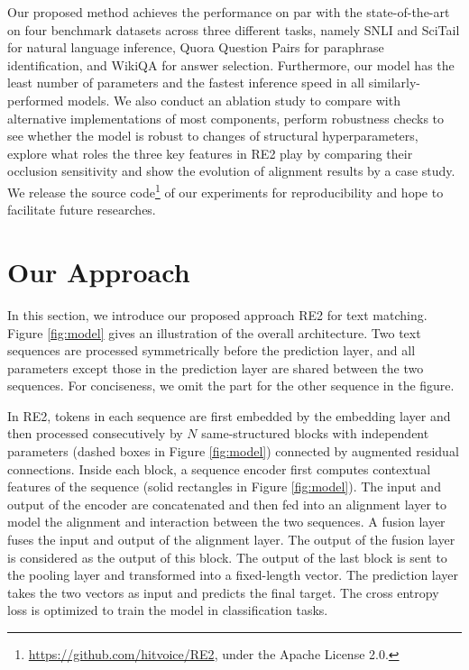 \documentclass[11pt,a4paper]{article}
\begin{document}
Our proposed method achieves the performance on par with the state-of-the-art on four benchmark datasets across three different tasks, namely SNLI and SciTail for natural language inference, Quora Question Pairs for paraphrase identification, and WikiQA for answer selection. Furthermore, our model has the least number of parameters and the fastest inference speed in all similarly-performed models. We also conduct an ablation study to compare with alternative implementations of most components, perform robustness checks to see whether the model is robust to changes of structural hyperparameters, explore what roles the three key features in RE2 play by comparing their occlusion sensitivity and show the evolution of alignment results by a case study. We release the source code\footnote{\url{https://github.com/hitvoice/RE2}, under the Apache License 2.0.} of our experiments for reproducibility and hope to facilitate future researches.

\section{Our Approach}

In this section, we introduce our proposed approach RE2 for text matching. Figure \ref{fig:model} gives an illustration of the overall architecture. 
Two text sequences are processed symmetrically before the prediction layer, and all parameters except those in the prediction layer are shared between the two sequences. For conciseness, we omit the part for the other sequence in the figure.

In RE2, tokens in each sequence are first embedded by the embedding layer and then processed consecutively by $N$ same-structured blocks with independent parameters (dashed boxes in Figure \ref{fig:model}) connected by augmented residual connections. Inside each block, a sequence encoder first computes contextual features of the sequence (solid rectangles in Figure \ref{fig:model}). The input and output of the encoder are concatenated and then fed into an alignment layer to model the alignment and interaction between the two sequences. A fusion layer fuses the input and output of the alignment layer. The output of the fusion layer is considered as the output of this block. The output of the last block is sent to the pooling layer and transformed into a fixed-length vector. The prediction layer takes the two vectors as input and predicts the final target. The cross entropy loss is optimized to train the model in classification tasks.
\end{document}
